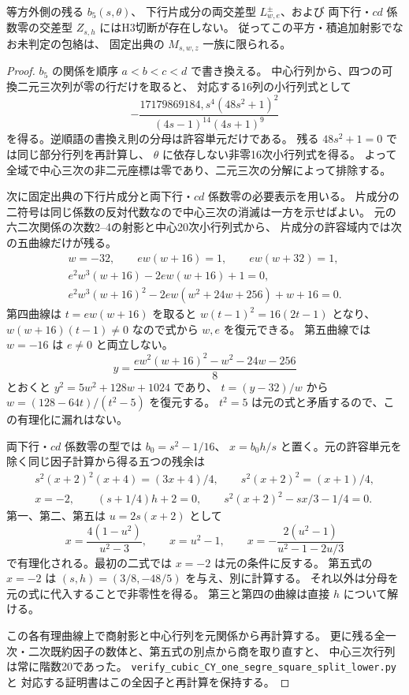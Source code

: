\begin{proposition}\label{prop:cubic-CY-one-segre-square-split-boundary-cross}
等方外側の残る $b_5(s,\theta)$、
下行片成分の両交差型 $L^\pm_{w,e}$、および
両下行・$cd$ 係数零の交差型 $Z_{s,h}$ にはH3切断が存在しない。
従ってこの平方・積追加射影でなお未判定の包絡は、
固定出典の $M_{s,w,z}$ 一族に限られる。
\end{proposition}
\begin{proof}
$b_5$ の関係を順序 $a<b<c<d$ で書き換える。
中心行列から、四つの可換二元三次列が零の行だけを取ると、
対応する16列の小行列式として
\[
 -\frac{17179869184,s^4(48s^2+1)^2}{(4s-1)^{14}(4s+1)^9}
\]
を得る。逆順語の書換え則の分母は許容単元だけである。
残る $48s^2+1=0$ では同じ部分行列を再計算し、
$\theta$ に依存しない非零16次小行列式を得る。
よって全域で中心三次の非二元座標は零であり、二元三次の分解によって排除する。

次に固定出典\cite{AS4CYpinned}の下行片成分と両下行・$cd$ 係数零の必要表示を用いる。
片成分の二符号は同じ係数の反対代数なので中心三次の消滅は一方を示せばよい。
元の六二次関係の次数2--4の射影と中心20次小行列式から、
片成分の許容域内では次の五曲線だけが残る。
\[
\begin{gathered}
 w=-32,\qquad e w(w+16)=1,\qquad e w(w+32)=1,\\
 e^2w^3(w+16)-2e w(w+16)+1=0,\\
 e^2w^3(w+16)^2-2ew(w^2+24w+256)+w+16=0 .
\end{gathered}
\]
第四曲線は $t=ew(w+16)$ を取ると
$w(t-1)^2=16(2t-1)$ となり、$w(w+16)(t-1)\ne0$ なので式から $w,e$ を復元できる。
第五曲線では $w=-16$ は $e\ne0$ と両立しない。
\[
 y=\frac{e w^2(w+16)^2-w^2-24w-256}{8}
\]
とおくと $y^2=5w^2+128w+1024$ であり、
$t=(y-32)/w$ から $w=(128-64t)/(t^2-5)$ を復元する。
$t^2=5$ は元の式と矛盾するので、この有理化に漏れはない。

両下行・$cd$ 係数零の型では $b_0=s^2-1/16$、
$x=b_0h/s$ と置く。元の許容単元を除く同じ因子計算から得る五つの残余は
\[
\begin{gathered}
 s^2(x+2)^2(x+4)=(3x+4)/4,\qquad
 s^2(x+2)^2=(x+1)/4,\\
 x=-2,\qquad (s+1/4)h+2=0,\qquad
 s^2(x+2)^2-sx/3-1/4=0 .
\end{gathered}
\]
第一、第二、第五は $u=2s(x+2)$ として
\[
 x=\frac{4(1-u^2)}{u^2-3},\qquad
 x=u^2-1,\qquad
 x=-\frac{2(u^2-1)}{u^2-1-2u/3}
\]
で有理化される。最初の二式では $x=-2$ は元の条件に反する。
第五式の $x=-2$ は $(s,h)=(3/8,-48/5)$ を与え、別に計算する。
それ以外は分母を元の式に代入することで非零性を得る。
第三と第四の曲線は直接 $h$ について解ける。

この各有理曲線上で商射影と中心行列を元関係から再計算する。
更に残る全一次・二次既約因子の数体と、第五式の別点から商を取り直すと、
中心三次行列は常に階数20であった。
\texttt{verify\_cubic\_CY\_one\_segre\_square\_split\_lower.py} と
対応する証明書はこの全因子と再計算を保持する。
\end{proof}

